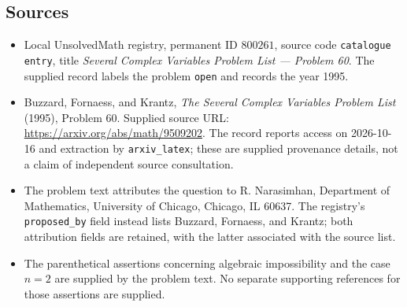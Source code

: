 \documentclass[11pt]{article}
\begin{document}
\subsection{Sources}
\begin{itemize}
\item Local UnsolvedMath registry, permanent ID \(800261\), source code \texttt{catalogue entry}, title \emph{Several Complex Variables Problem List --- Problem 60}. The supplied record labels the problem \texttt{open} and records the year 1995.
\item Buzzard, Fornaess, and Krantz, \emph{The Several Complex Variables Problem List} (1995), Problem 60. Supplied source URL: \url{https://arxiv.org/abs/math/9509202}. The record reports access on 2026-10-16 and extraction by \texttt{arxiv\_latex}; these are supplied provenance details, not a claim of independent source consultation.
\item The problem text attributes the question to R. Narasimhan, Department of Mathematics, University of Chicago, Chicago, IL 60637. The registry's \texttt{proposed\_by} field instead lists Buzzard, Fornaess, and Krantz; both attribution fields are retained, with the latter associated with the source list.
\item The parenthetical assertions concerning algebraic impossibility and the case \(n=2\) are supplied by the problem text. No separate supporting references for those assertions are supplied.
\end{itemize}
\end{document}
